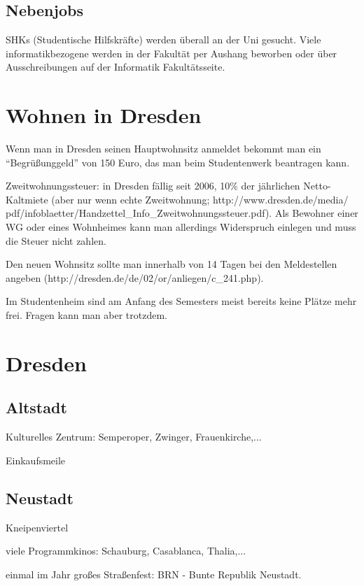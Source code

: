 \documentclass[a4paper,12pt]{report}
\begin{document}
\subsection{Nebenjobs}
SHKs (Studentische Hilfskräfte) werden überall an der Uni gesucht. Viele informatikbezogene werden in der Fakultät per Aushang beworben oder über Ausschreibungen auf der Informatik Fakultätsseite.

\section{Wohnen in Dresden}
\begin{itemize*}
\item Wenn man in Dresden seinen Hauptwohnsitz anmeldet bekommt man ein ``Begrüßunggeld'' von 150 Euro, das man beim Studentenwerk beantragen kann.
\item Zweitwohnungssteuer: in Dresden fällig seit 2006, 10\% der jährlichen Netto-Kaltmiete (aber nur wenn echte Zweitwohnung; http://www.dresden.de/media/ pdf/infoblaetter/Handzettel\_Info\_Zweitwohnungssteuer.pdf). Als Bewohner einer WG oder eines Wohnheimes kann man allerdings Widerspruch einlegen und muss die Steuer nicht zahlen.
\item Den neuen Wohnsitz sollte man innerhalb von 14 Tagen bei den Meldestellen angeben (http://dresden.de/de/02/or/anliegen/c\_241.php).
\item Im Studentenheim sind am Anfang des Semesters meist bereits keine Plätze mehr frei. Fragen kann man aber trotzdem.
\end{itemize*}

\section{Dresden}

\subsection{Altstadt}
\begin{itemize*}
\item Kulturelles Zentrum: Semperoper, Zwinger, Frauenkirche,...
\item Einkaufsmeile
\end{itemize*}

\subsection{Neustadt}
\begin{itemize*}
\item Kneipenviertel
\item viele Programmkinos: Schauburg, Casablanca, Thalia,...
\item einmal im Jahr großes Straßenfest: BRN - Bunte Republik Neustadt.
\end{itemize*}
\end{document}
